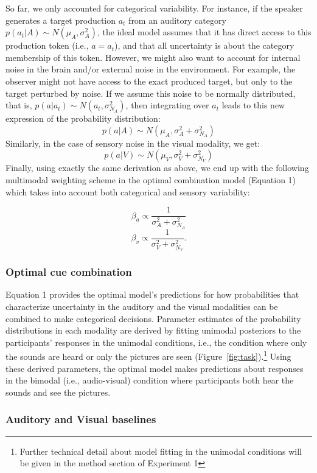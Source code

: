 \documentclass[english,floatsintext,man]{apa6}
\theoremstyle{definition}
\theoremstyle{definition}
\theoremstyle{definition}
\theoremstyle{remark}
\begin{document}
So far, we only accounted for categorical variability. For instance, if
the speaker generates a target production \(a_t\) from an auditory
category \(p(a_t | A) \sim N(\mu_{A}, \sigma^2_{A})\), the ideal model
assumes that it has direct access to this production token (i.e.,
\(a=a_t\)), and that all uncertainty is about the category membership of
this token. However, we might also want to account for internal noise in
the brain and/or external noise in the environment. For example, the
observer might not have access to the exact produced target, but only to
the target perturbed by noise. If we assume this noise to be normally
distributed, that is, \(p(a | a_t) \sim N(a_t, \sigma^2_{N_A})\), then
integrating over \(a_t\) leads to this new expression of the probability
distribution: \[ p(a | A) \sim N(\mu_{A}, \sigma^2_{A}+\sigma^2_{N_A})\]
Similarly, in the case of sensory noise in the visual modality, we get:
\[ p(a | V) \sim N(\mu_{V}, \sigma^2_{V}+\sigma^2_{N_V})\] Finally,
using exactly the same derivation as above, we end up with the following
multimodal weighting scheme in the optimal combination model (Equation
1) which takes into account both categorical and sensory variability:

\[\beta_a \propto \frac{1}{\sigma^2_{A}+\sigma^2_{N_A}}\]
\[\beta_v \propto \frac{1}{\sigma^2_{V} +\sigma^2_{N_V}}.\]

\subsubsection{Optimal cue combination}\label{optimal-cue-combination}

Equation 1 provides the optimal model's predictions for how
probabilities that characterize uncertainty in the auditory and the
visual modalities can be combined to make categorical decisions.
Parameter estimates of the probability distributions in each modality
are derived by fitting unimodal posteriors to the participants'
responses in the unimodal conditions, i.e., the condition where only the
sounds are heard or only the pictures are seen
(Figure~\ref{fig:task}).\footnote{Further technical detail about model fitting in the unimodal conditions will be given in the method section of Experiment 1}
Using these derived parameters, the optimal model makes predictions
about responses in the bimodal (i.e., audio-visual) condition where
participants both hear the sounds and see the pictures.

\subsubsection{Auditory and Visual
baselines}\label{auditory-and-visual-baselines}
\end{document}
